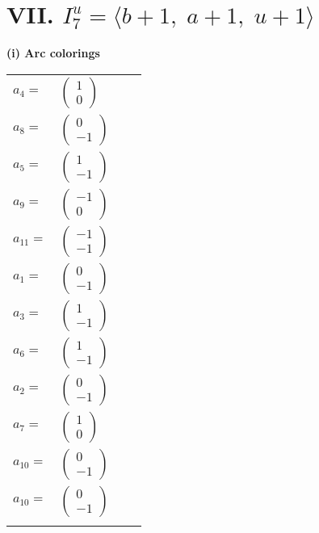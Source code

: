 \documentclass[1p]{elsarticle_modified}
\theoremstyle{definition}
\begin{document}
\centering \section*{VII. $I^u_{7}= \langle b+1,\;a+1,\;u+1 \rangle$}
\flushleft \textbf{(i) Arc colorings}\\
\begin{tabular}{m{7pt} m{180pt} m{7pt} m{180pt} }
\flushright $a_{4}=$&$\begin{pmatrix}1\\0\end{pmatrix}$ \\
\flushright $a_{8}=$&$\begin{pmatrix}0\\-1\end{pmatrix}$ \\
\flushright $a_{5}=$&$\begin{pmatrix}1\\-1\end{pmatrix}$ \\
\flushright $a_{9}=$&$\begin{pmatrix}-1\\0\end{pmatrix}$ \\
\flushright $a_{11}=$&$\begin{pmatrix}-1\\-1\end{pmatrix}$ \\
\flushright $a_{1}=$&$\begin{pmatrix}0\\-1\end{pmatrix}$ \\
\flushright $a_{3}=$&$\begin{pmatrix}1\\-1\end{pmatrix}$ \\
\flushright $a_{6}=$&$\begin{pmatrix}1\\-1\end{pmatrix}$ \\
\flushright $a_{2}=$&$\begin{pmatrix}0\\-1\end{pmatrix}$ \\
\flushright $a_{7}=$&$\begin{pmatrix}1\\0\end{pmatrix}$ \\
\flushright $a_{10}=$&$\begin{pmatrix}0\\-1\end{pmatrix}$\\ \flushright $a_{10}=$&$\begin{pmatrix}0\\-1\end{pmatrix}$\\&\end{tabular}
\end{document}
